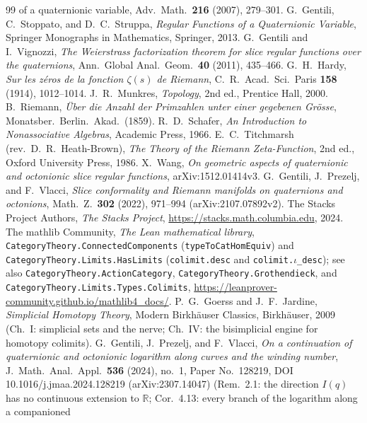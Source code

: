 \documentclass[11pt]{article}
\newcommand{\RR}{\mathbb{R}}
\theoremstyle{plain}
\theoremstyle{definition}
\theoremstyle{remark}
\begin{document}
\begin{thebibliography}{99}
{of a quaternionic variable}, Adv.\ Math.\ \textbf{216} (2007), 279--301.
 G.~Gentili, C.~Stoppato, and D.~C.~Struppa, \emph{Regular Functions of
a Quaternionic Variable}, Springer Monographs in Mathematics, Springer, 2013.
 G.~Gentili and I.~Vignozzi, \emph{The Weierstrass factorization theorem
for slice regular functions over the quaternions}, Ann.\ Global Anal.\ Geom.\
\textbf{40} (2011), 435--466.
 G.~H.~Hardy, \emph{Sur les z\'eros de la fonction $\zeta(s)$ de
Riemann}, C.\ R.\ Acad.\ Sci.\ Paris \textbf{158} (1914), 1012--1014.
\bibitem{Munkres00} J.~R.~Munkres, \emph{Topology}, 2nd ed., Prentice Hall, 2000.
\bibitem{Riemann1859} B.~Riemann, \emph{\"Uber die Anzahl der Primzahlen unter einer
gegebenen Gr\"osse}, Monatsber.\ Berlin.\ Akad.\ (1859).
 R.~D.~Schafer, \emph{An Introduction to Nonassociative Algebras},
Academic Press, 1966.
 E.~C.~Titchmarsh (rev.\ D.~R.~Heath-Brown), \emph{The Theory of
the Riemann Zeta-Function}, 2nd ed., Oxford University Press, 1986.
\bibitem{Wang} X.~Wang, \emph{On geometric aspects of quaternionic and octonionic
slice regular functions}, arXiv:1512.01414v3.
 G.~Gentili, J.~Prezelj, and F.~Vlacci, \emph{Slice conformality and
Riemann manifolds on quaternions and octonions}, Math.\ Z.\ \textbf{302} (2022),
971--994 (arXiv:2107.07892v2).
 The Stacks Project Authors, \emph{The Stacks Project},
\url{https://stacks.math.columbia.edu}, 2024.
 The mathlib Community, \emph{The Lean mathematical library},
\texttt{CategoryTheory.ConnectedComponents}
(\texttt{typeToCatHomEquiv}) and \texttt{CategoryTheory.Limits.HasLimits}
(\texttt{colimit.desc} and \texttt{colimit.}$\iota$\texttt{\_desc}); see also
\texttt{CategoryTheory.ActionCategory}, \texttt{CategoryTheory.Grothendieck},
and \texttt{CategoryTheory.Limits.Types.Colimits},
\url{https://leanprover-community.github.io/mathlib4_docs/}.
 P.~G.~Goerss and J.~F.~Jardine, \emph{Simplicial Homotopy Theory}, Modern
Birkh\"auser Classics, Birkh\"auser, 2009 (Ch.~I: simplicial sets and the nerve; Ch.~IV: the
bisimplicial engine for homotopy colimits).
 G.~Gentili, J.~Prezelj, and F.~Vlacci, \emph{On a continuation of
quaternionic and octonionic logarithm along curves and the winding number},
J.~Math.\ Anal.\ Appl.\ \textbf{536} (2024), no.~1, Paper No.~128219,
DOI 10.1016/j.jmaa.2024.128219 (arXiv:2307.14047) (Rem.~2.1: the direction $I(q)$ has no
continuous extension to $\RR$; Cor.~4.13: every branch of the logarithm along a companioned

\end{thebibliography}
\end{document}

